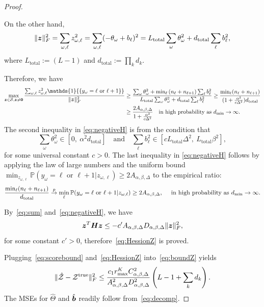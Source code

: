 \documentclass{article}
\theoremstyle{plain}
\theoremstyle{definition}
\begin{document}
\begin{proof}
\begin{enumerate}
On the other hand,
\[
\lVert\bm{z}\rVert_F^2=\sum_{\omega,\ell}z^2_{\omega,\ell}=\sum_{\omega,\ell}(-\theta_\omega+b_\ell)^2=L_{\text{total}}\sum_{\omega}\theta^2_\omega+d_{\text{total}}\sum_\ell b^2_\ell,
\]
where $L_{\text{total}}:=(L-1)$ and $d_{\text{total}}:=\prod_k d_k$.

Therefore, we have
\begin{align}\label{eq:negativeH}
\max_{\mz\in\tS,\mz\neq \mathbf{0}}{\sum_{\omega,\ell} z^2_{\omega,\ell}\mathds{1}\{\{y_\omega=\ell \text{ or }\ell+1\}\} \over \FnormSize{}{\mz}^2}&\geq {\sum_{\omega}\theta^2_\omega+\min_\ell\left(n_{\ell}+n_{\ell+1}\right)\sum_{\ell}b_\ell^2\over L_{\text{total}} \sum_{\omega}\theta^2_\omega+d_{\text{total}}\sum_\ell b^2_\ell}
\geq{\min_{\ell}(n_\ell+n_{\ell+1})\over (1+{\alpha^2\over c\Delta^2})d_{\text{total}}}\notag\\
&\geq {2A_{\alpha,\beta,\Delta}\over 1+{\alpha^2\over c\Delta^2}}\quad \text{in high probability as $d_{\min}\to \infty$}. 
\end{align}
The second inequality in \eqref{eq:negativeH} is from the condition that 
\[
\sum_{\omega}\theta_\omega^2\in [0,\ \alpha^2 d_{\text{total}}]\quad \text{and}\quad \sum_\ell b_\ell^2 \in[c L_{\text{total}}\Delta^2,\  L_{\text{total}}\beta^2],
\]
for some universal constant $c>0$. 
The last inequality in \eqref{eq:negativeH} follows by applying the law of large numbers and the uniform bound $\min_{z_{\omega,\ell}}\mathbb{P}(y_{\omega}=\ell \text{ or }\ell+1|z_{\omega,\ell})\geq 2A_{\alpha,\beta,\Delta}$ to the empirical ratio:
\[
{\min_{\ell}(n_\ell+n_{\ell+1})\over d_{\text{total}}}\overset{p}{\to}\min_{\ell} \mathbb{P}(y_{\omega}=\ell \text{ or }\ell+1|z_{\omega,\ell}) \geq 2A_{\alpha,\beta,\Delta}, \quad \text{ in high probability as $d_{\min}\to \infty$}.
\] 

By~\eqref{eq:sum} and~\eqref{eq:negativeH}, we have
\begin{equation}\label{eq:boundH}
\bm{z}^T\bm{H}\bm{z} \leq- c'A_{\alpha,\beta,\Delta}D_{\alpha,\beta,\Delta}\lVert\bm{z}\rVert_F^2,
\end{equation}
for some constant $c'>0$, therefore~\eqref{eq:HessionZ} is proved.
\end{enumerate}

 Plugging~\eqref{eq:scorebound} and~\eqref{eq:HessionZ} into~\eqref{eq:boundZ} yields
\[
\lVert\hat {\mathcal{Z}}-\mathcal{Z}^{\mathrm{true}}\rVert_F^2 \leq {c_1r^{K}_{\max}C^2_{\alpha,\beta,\Delta}\over A^2_{\alpha,\beta,\Delta}D^2_{\alpha,\beta,\Delta}}\left(L-1+\sum_k d_k\right).
\]
The MSEs for $\hat \Theta$ and $\hat {\bm{b}}$ readily follow from~\eqref{eq:decomp}. 

 
\end{proof}
\end{document}
